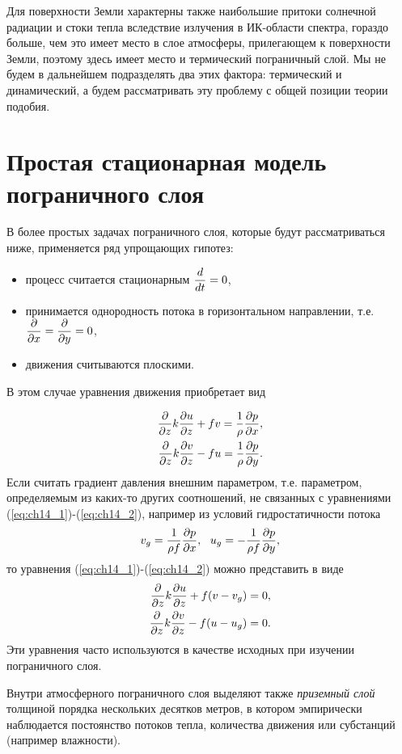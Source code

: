 Для поверхности Земли характерны также наибольшие притоки солнечной радиации и стоки тепла вследствие излучения в ИК-области спектра, гораздо больше, чем это имеет место в слое атмосферы, прилегающем к поверхности Земли, поэтому здесь имеет место и термический пограничный слой. Мы не будем в дальнейшем подразделять два этих фактора: термический и динамический, а будем рассматривать эту проблему с общей позиции теории подобия.

\section{{\color{done}Простая стационарная модель пограничного слоя}}

В более простых задачах пограничного слоя, которые будут рассматриваться ниже, применяется ряд упрощающих гипотез:
\begin{itemize}
  \item процесс считается стационарным $\displaystyle\frac{d }{d t}=0$,
  \item принимается однородность потока в горизонтальном направлении, т.е. $\displaystyle\frac{\partial }{\partial x}=\displaystyle\frac{\partial }{\partial y}=0$,
  \item движения считываются плоскими.
\end{itemize}

В этом случае уравнения движения приобретает вид

\begin{align}
    \displaystyle\frac{\partial }{\partial z}k\displaystyle\frac{\partial u}{\partial z}+fv=\frac{1}{\rho}\displaystyle\frac{\partial p}{\partial x}, \label{eq:ch14_1} \\
    \displaystyle\frac{\partial }{\partial z}k\displaystyle\frac{\partial v}{\partial z}-fu=\frac{1}{\rho}\displaystyle\frac{\partial p}{\partial y}. \label{eq:ch14_2} 
\end{align}
Если считать градиент давления внешним параметром, т.е. параметром, определяемым из каких-то других соотношений, не связанных с уравнениями (\ref{eq:ch14_1})-(\ref{eq:ch14_2}), например из условий гидростатичности потока
\begin{equation*}
    v_g=\frac{1}{\rho f}\displaystyle\frac{\partial p}{\partial x}, \:\:\: u_g=-\frac{1}{\rho f}\displaystyle\frac{\partial p}{\partial y},
\end{equation*}
то уравнения (\ref{eq:ch14_1})-(\ref{eq:ch14_2}) можно представить в виде
\begin{align}
    \displaystyle\frac{\partial }{\partial z}k\displaystyle\frac{\partial u}{\partial z}+f(v-v_g)=0 \label{eq:ch14_3}, \\
    \displaystyle\frac{\partial }{\partial z}k\displaystyle\frac{\partial v}{\partial z}-f(u-u_g)=0 \label{eq:ch14_4}.
\end{align}
Эти уравнения часто используются в качестве исходных при изучении пограничного слоя.

Внутри атмосферного пограничного слоя выделяют также \textit{приземный слой} толщиной порядка нескольких десятков метров, в котором эмпирически наблюдается постоянство потоков тепла, количества движения или субстанций (например влажности). 

